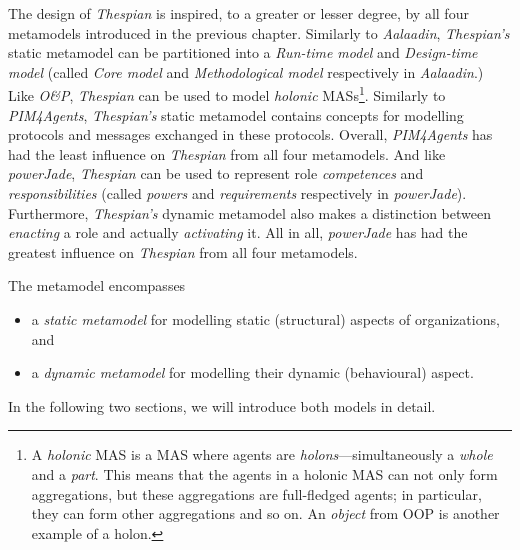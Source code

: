 The design of \textit{Thespian} is inspired, to a greater or lesser degree, by all four metamodels introduced in the previous chapter.
Similarly to \textit{Aalaadin}, \textit{Thespian's} static metamodel can be partitioned into a \textit{Run-time model} and \textit{Design-time model} (called \textit{Core model} and \textit{Methodological model} respectively in \textit{Aalaadin}.)
Like \textit{O\&P}, \textit{Thespian} can be used to model \textit{holonic} MASs\footnote{A \textit{holonic} MAS is a MAS where agents are \textit{holons}---simultaneously a \textit{whole} and a \textit{part}. This means that the agents in a holonic MAS can not only form aggregations, but these aggregations are full-fledged agents; in particular, they can form other aggregations and so on. An \textit{object} from OOP is another example of a holon.}.
Similarly to \textit{PIM4Agents}, \textit{Thespian's} static metamodel contains concepts for modelling protocols and messages exchanged in these protocols. Overall, \textit{PIM4Agents} has had the least influence on \textit{Thespian} from all four metamodels.
And like \textit{powerJade}, \textit{Thespian} can be used to represent role \textit{competences} and \textit{responsibilities} (called \textit{powers} and \textit{requirements} respectively in \textit{powerJade}).
Furthermore, \textit{Thespian's} dynamic metamodel also makes a distinction between \textit{enacting} a role and actually \textit{activating} it.
All in all, \textit{powerJade} has had the greatest influence on \textit{Thespian} from all four metamodels.

The metamodel encompasses
\begin{itemize}
	\item a \textit{static metamodel} for modelling static (structural) aspects of organizations, and
	\item a \textit{dynamic metamodel} for modelling their dynamic (behavioural) aspect.
\end{itemize}
In the following two sections, we will introduce both models in detail.



